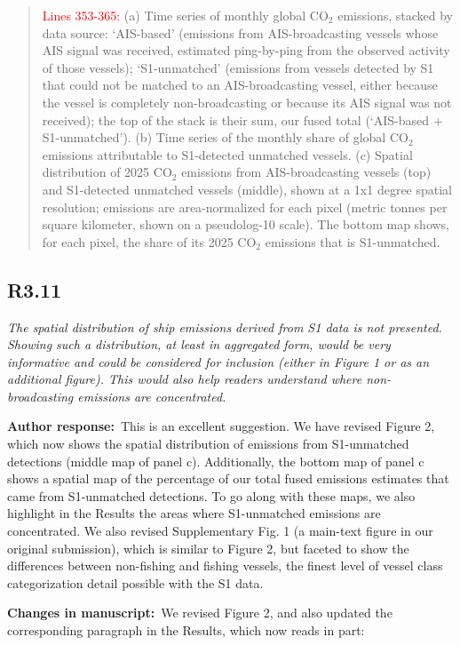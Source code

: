 \documentclass[11pt]{article}
\newcommand{\point}[1]{\subsection*{\normalfont\bfseries #1}}
\newcommand{\response}{\par\medskip\noindent%
  \textbf{\textcolor{respblue}{Author response:}}\ }
\newcommand{\changes}{\par\medskip\noindent%
  \textbf{\textcolor{changegreen}{Changes in manuscript:}}\ }
\begin{document}
\begin{quote}
\textcolor{red}{Lines 353-365:}
(a) Time series of monthly global CO$_2$ emissions, stacked by data source: `AIS-based' (emissions from AIS-broadcasting vessels whose AIS signal was received, estimated ping-by-ping from the observed activity of those vessels); `S1-unmatched' (emissions from vessels detected by S1 that could not be matched to an AIS-broadcasting vessel, either because the vessel is completely non-broadcasting or because its AIS signal was not received); the top of the stack is their sum, our fused total (`AIS-based + S1-unmatched'). (b) Time series of the monthly share of global CO$_{2}$ emissions attributable to S1-detected unmatched vessels. (c) Spatial distribution of 2025 CO$_{2}$ emissions from AIS-broadcasting vessels (top) and S1-detected unmatched vessels (middle), shown at a 1x1 degree spatial resolution; emissions are area-normalized for each pixel (metric tonnes per square kilometer, shown on a pseudolog-10 scale). The bottom map shows, for each pixel, the share of its 2025 CO$_{2}$ emissions that is S1-unmatched.
\end{quote}

\point{R3.11}

\begin{refquote}\itshape
The spatial distribution of ship emissions derived from S1 data is not presented.
Showing such a distribution, at least in aggregated form, would be very
informative and could be considered for inclusion (either in Figure 1 or as an
additional figure). This would also help readers understand where
non-broadcasting emissions are concentrated.
\end{refquote}

\response This is an excellent suggestion. We have revised Figure 2, which now shows the spatial distribution of emissions from S1-unmatched detections (middle map of panel c). Additionally, the bottom map of panel c shows a spatial map of the percentage of our total fused emissions estimates that came from S1-unmatched detections. To go along with these maps, we also highlight in the Results the areas where S1-unmatched emissions are concentrated. We also revised Supplementary Fig. 1 (a main-text figure in our original submission), which is similar to Figure 2, but faceted to show the differences between non-fishing and fishing vessels, the finest level of vessel class categorization detail possible with the S1 data.

\changes We revised Figure 2, and also updated the corresponding paragraph in the Results, which now reads in part:
\end{document}
